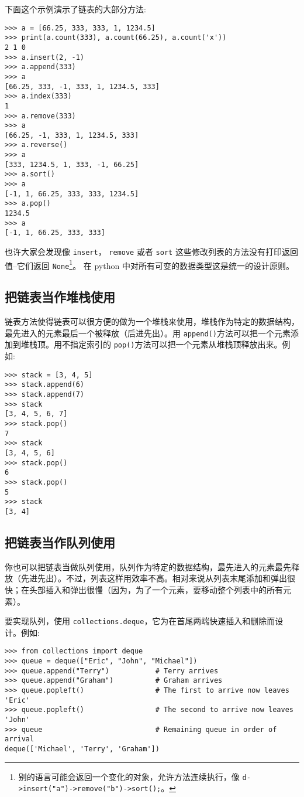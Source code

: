 下面这个示例演示了链表的大部分方法:
\begin{lstlisting}
>>> a = [66.25, 333, 333, 1, 1234.5]
>>> print(a.count(333), a.count(66.25), a.count('x'))
2 1 0
>>> a.insert(2, -1)
>>> a.append(333)
>>> a
[66.25, 333, -1, 333, 1, 1234.5, 333]
>>> a.index(333)
1
>>> a.remove(333)
>>> a
[66.25, -1, 333, 1, 1234.5, 333]
>>> a.reverse()
>>> a
[333, 1234.5, 1, 333, -1, 66.25]
>>> a.sort()
>>> a
[-1, 1, 66.25, 333, 333, 1234.5]
>>> a.pop()
1234.5
>>> a
[-1, 1, 66.25, 333, 333]
\end{lstlisting}
也许大家会发现像 \texttt{insert}， \texttt{remove} 或者 \texttt{sort} 这些修改列表的方法没有打印返回值–它们返回 \texttt{None}\footnote{别的语言可能会返回一个变化的对象，允许方法连续执行，像 \texttt{d->insert("a")->remove("b")->sort();}。}。 在 python 中对所有可变的数据类型这是统一的设计原则。
\subsection{把链表当作堆栈使用}
链表方法使得链表可以很方便的做为一个堆栈来使用，堆栈作为特定的数据结构，最先进入的元素最后一个被释放（后进先出）。用 \texttt{append()}方法可以把一个元素添加到堆栈顶。用不指定索引的 \texttt{pop()}方法可以把一个元素从堆栈顶释放出来。例如:
\begin{lstlisting}
>>> stack = [3, 4, 5]
>>> stack.append(6)
>>> stack.append(7)
>>> stack
[3, 4, 5, 6, 7]
>>> stack.pop()
7
>>> stack
[3, 4, 5, 6]
>>> stack.pop()
6
>>> stack.pop()
5
>>> stack
[3, 4]
\end{lstlisting}
\subsection{把链表当作队列使用}
你也可以把链表当做队列使用，队列作为特定的数据结构，最先进入的元素最先释放（先进先出）。不过，列表这样用效率不高。相对来说从列表末尾添加和弹出很快；在头部插入和弹出很慢（因为，为了一个元素，要移动整个列表中的所有元素）。

要实现队列，使用 \texttt{collections.deque}，它为在首尾两端快速插入和删除而设计。例如:
\begin{lstlisting}
>>> from collections import deque
>>> queue = deque(["Eric", "John", "Michael"])
>>> queue.append("Terry")           # Terry arrives
>>> queue.append("Graham")          # Graham arrives
>>> queue.popleft()                 # The first to arrive now leaves
'Eric'
>>> queue.popleft()                 # The second to arrive now leaves
'John'
>>> queue                           # Remaining queue in order of arrival
deque(['Michael', 'Terry', 'Graham'])
\end{lstlisting}
